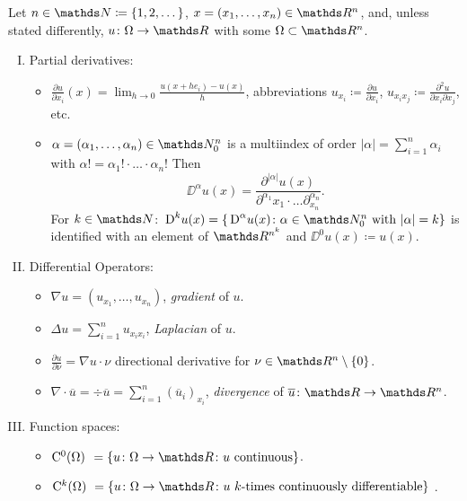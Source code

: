 \newpage
\begin{ntion}
  Let $n \in \N \coloneqq \{1,2,\dots\}$, $x  = (x_1,\dots, x_n) \in \R^n$, and, unless stated differently, $u \colon \Omega \to \R$ with some $\Omega \subset \R^n$.
  \begin{enumerate}[I)]
    \item Partial derivatives:
      \begin{itemize}
        \item $\frac{\partial u}{\partial x_i}(x) = \lim_{h \to 0} \frac{u(x + he_i) - u(x)}{h}$, abbreviations $u_{x_i} \coloneq \frac{\partial u}{\partial x_i}$, $u_{x_i x_j} \coloneqq \frac{\partial^2 u}{\partial x_i \partial x_j}$, etc.
        \item $\alpha = (\alpha_1,\dots,\alpha_n) \in \N_0^n$ is a multiindex of order $|\alpha| = \sum_{i = 1}^n \alpha_i$ with $\alpha! = \alpha_1! \cdot\ldots\cdot\alpha_n!$
          Then
          $$
          \DD^\alpha u(x) = \frac{\partial^|\alpha| u(x)}{\partial^{\alpha_1} x_1 \cdot \ldots \partial^{\alpha_n}_{x_n}}.
          $$
          For $k \in \N$: $\DD^k u(x) = \{\DD^\alpha u(x) \colon \alpha \in \N_0^n \text{ with } |\alpha| = k \}$ is identified with an element of $\R^{n^k}$ and $\DD^0 u(x) \coloneqq u(x)$.
      \end{itemize}

    \item Differential Operators:
      \begin{itemize}
        \item $\nabla u = (u_{x_1}, \dots, u_{x_n})$, \emph{gradient} of $u$.
        \item $\Delta u = \sum_{i = 1}^n u_{x_i x_i}$, \emph{Laplacian} of $u$.
        \item $\frac{\partial u}{\partial \nu} = \nabla u \cdot \nu$ directional derivative for $\nu \in \R^n \setminus\{0\}$.
        \item $\nabla \cdot \overline u = \div \overline u = \sum_{i = 1}^n (\overline u_i)_{x_i}$, \emph{divergence} of $\overline u \colon \R \to \R^n$.
      \end{itemize}


    \item Function spaces:
      \begin{itemize}
        \item $\CC^0(\Omega)
          \nicestspace 
          = \{u \colon \Omega \to \R \colon u \text{ continuous}\}$.
        \item $\CC^k(\Omega)
          \nicerspace 
          = \{u \colon \Omega \to \R \colon u \text{ $k$-times continuously differentiable}\}$ .
          

\end{itemize}
\end{enumerate}
\end{ntion}
